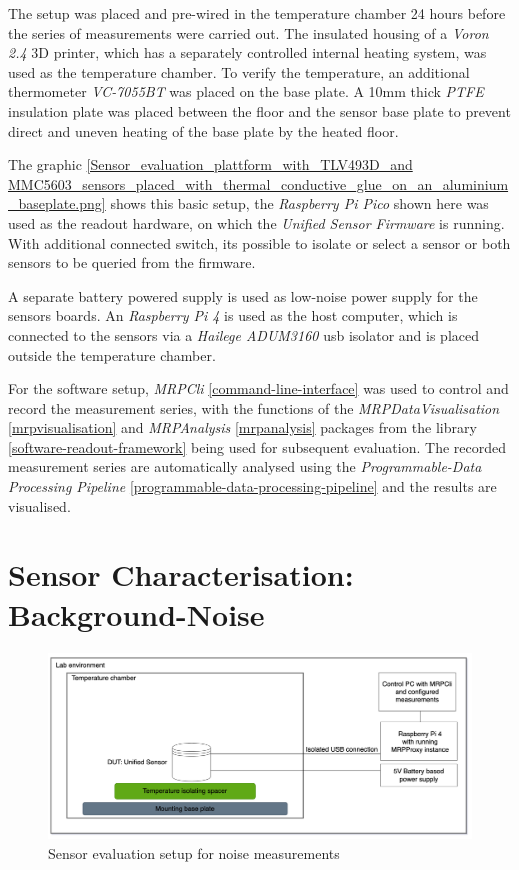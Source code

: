 The setup was placed and pre-wired in the temperature chamber 24 hours
before the series of measurements were carried out. The insulated
housing of a \emph{Voron 2.4} 3D printer, which has a separately
controlled internal heating system, was used as the temperature chamber.
To verify the temperature, an additional thermometer \emph{VC-7055BT}
was placed on the base plate. A 10mm thick \emph{PTFE} insulation plate
was placed between the floor and the sensor base plate to prevent direct
and uneven heating of the base plate by the heated floor.

The graphic
\ref{Sensor_evaluation_plattform_with_TLV493D_and MMC5603_sensors_placed_with_thermal_conductive_glue_on_an_aluminium_baseplate.png}
shows this basic setup, the \emph{Raspberry Pi Pico} shown here was used
as the readout hardware, on which the \emph{Unified Sensor Firmware} is
running. With additional connected switch, its possible to isolate or
select a sensor or both sensors to be queried from the firmware.

A separate battery powered supply is used as low-noise power supply for
the sensors boards. An \emph{Raspberry Pi 4} is used as the host
computer, which is connected to the sensors via a \emph{Hailege
ADUM3160} \gls{usb} isolator and is placed outside the temperature
chamber.

For the software setup, \emph{MRPCli} \ref{command-line-interface} was
used to control and record the measurement series, with the functions of
the \emph{MRPDataVisualisation} \ref{mrpvisualisation} and
\emph{MRPAnalysis} \ref{mrpanalysis} packages from the library
\ref{software-readout-framework} being used for subsequent evaluation.
The recorded measurement series are automatically analysed using the
\emph{Programmable-Data Processing Pipeline}
\ref{programmable-data-processing-pipeline} and the results are
visualised.

\hypertarget{sensor-characterisation-background-noise}{%
\section{Sensor Characterisation:
Background-Noise}\label{sensor-characterisation-background-noise}}

\begin{figure}
\centering
\includegraphics{./generated_images/border_Sensor_evaluation_setup_for_noise_measurements.png}
\caption{Sensor evaluation setup for noise measurements
\label{Sensor_evaluation_setup_for_noise_measurements.png}}
\end{figure}

